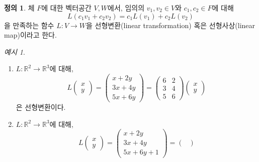 \documentclass[unfonts,oneside,a4paper]{oblivoir}
\theoremstyle{definition}
\newtheorem{definition}{정의}[section]
\theoremstyle{theorem}
\theoremstyle{theorem}
\theoremstyle{remark}
\theoremstyle{remark}
\theoremstyle{remark}
\newtheorem*{example}{예시}
\theoremstyle{remark}
\renewcommand{\vec}[1]{\bm{\mathit{#1}}}
\begin{document}
\begin{definition}
    체 $F$에 대한 벡터공간 $V, W$에서, 임의의 $\vec v_1, \vec v_2 \in V$와 $c_1, c_2 \in F$에 대해
    \begin{equation*}
        L(c_1 \vec v_1 + c_2 \vec v_2) = c_1 L(\vec v_1) + c_2 L(\vec v_2)
    \end{equation*}
    을 만족하는 함수 $L: V \rightarrow W$을 선형변환(linear transformation) 혹은 선형사상(linear map)이라고 한다.
\end{definition}

\begin{example}
    \leavevmode
    \begin{enumerate}
        \item $L: \mathbb R^2 \rightarrow \mathbb R^3$에 대해,
            \begin{equation*}
                L \begin{pmatrix}
                    x \\ y
                    \end{pmatrix} = \begin{pmatrix}
                    x + 2y \\ 3x + 4y \\ 5x + 6y
                    \end{pmatrix} = \begin{pmatrix}
                    6 & 2 \\ 3 & 4 \\ 5 & 6
                    \end{pmatrix} \begin{pmatrix}
                    x \\ y
                \end{pmatrix}
            \end{equation*}
            은 선형변환이다.
        \item $L: \mathbb R^2 \rightarrow \mathbb R^3$에 대해,
            \begin{equation*}
                L \begin{pmatrix}
                    x \\ y
                    \end{pmatrix} = \begin{pmatrix}
                    x + 2y \\ 3x + 4y \\ 5x + 6y + 1
                    \end{pmatrix} = \begin{pmatrix}

\end{pmatrix}
\end{equation*}
\end{enumerate}
\end{example}
\end{document}
